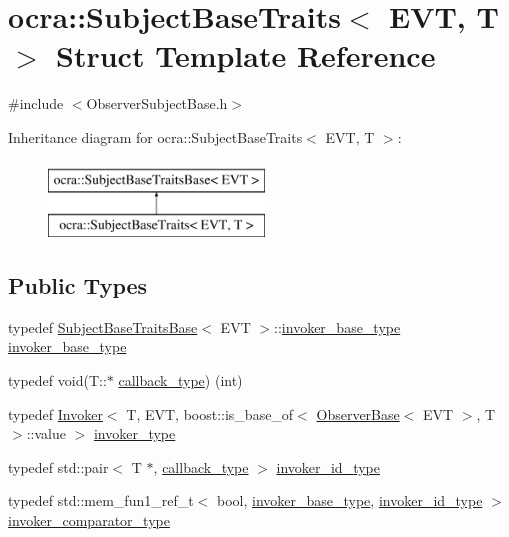 \hypertarget{structocra_1_1SubjectBaseTraits}{}\section{ocra\+:\+:Subject\+Base\+Traits$<$ E\+VT, T $>$ Struct Template Reference}
\label{structocra_1_1SubjectBaseTraits}


{\ttfamily \#include $<$Observer\+Subject\+Base.\+h$>$}

Inheritance diagram for ocra\+:\+:Subject\+Base\+Traits$<$ E\+VT, T $>$\+:\begin{figure}[H]
\begin{center}
\leavevmode
\includegraphics[height=2.000000cm]{dc/d3a/structocra_1_1SubjectBaseTraits}
\end{center}
\end{figure}
\subsection*{Public Types}
\begin{DoxyCompactItemize}
\item 
typedef \hyperlink{structocra_1_1SubjectBaseTraitsBase}{Subject\+Base\+Traits\+Base}$<$ E\+VT $>$\+::\hyperlink{structocra_1_1SubjectBaseTraitsBase_a439671662c8f8f3e80e6675f008dec3f}{invoker\+\_\+base\+\_\+type} \hyperlink{structocra_1_1SubjectBaseTraits_a067ad14df588b765cd8941e21348c954}{invoker\+\_\+base\+\_\+type}
\item 
typedef void(T\+::$\ast$ \hyperlink{structocra_1_1SubjectBaseTraits_ab8c572ba6805d72ddf4137da6e2f4480}{callback\+\_\+type}) (int)
\item 
typedef \hyperlink{classocra_1_1Invoker}{Invoker}$<$ T, E\+VT, boost\+::is\+\_\+base\+\_\+of$<$ \hyperlink{classocra_1_1ObserverBase}{Observer\+Base}$<$ E\+VT $>$, T $>$\+::value $>$ \hyperlink{structocra_1_1SubjectBaseTraits_a7d6f024ca6d59f607025916cbb7a3423}{invoker\+\_\+type}
\item 
typedef std\+::pair$<$ T $\ast$, \hyperlink{structocra_1_1SubjectBaseTraits_ab8c572ba6805d72ddf4137da6e2f4480}{callback\+\_\+type} $>$ \hyperlink{structocra_1_1SubjectBaseTraits_a2c4f3af9b3e93bf96232c36df6f43986}{invoker\+\_\+id\+\_\+type}
\item 
typedef std\+::mem\+\_\+fun1\+\_\+ref\+\_\+t$<$ bool, \hyperlink{structocra_1_1SubjectBaseTraitsBase_a439671662c8f8f3e80e6675f008dec3f}{invoker\+\_\+base\+\_\+type}, \hyperlink{structocra_1_1SubjectBaseTraits_a2c4f3af9b3e93bf96232c36df6f43986}{invoker\+\_\+id\+\_\+type} $>$ \hyperlink{structocra_1_1SubjectBaseTraits_a791cf85201dfcbdc6213946c36d698ca}{invoker\+\_\+comparator\+\_\+type}
\end{DoxyCompactItemize}


